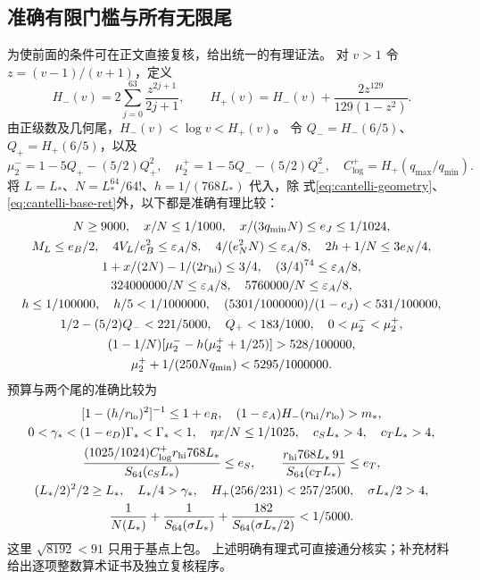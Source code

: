 \documentclass[UTF8,a4paper,11pt,fontset=fandol]{ctexart}
\theoremstyle{remark}
\begin{document}
\subsection{准确有限门槛与所有无限尾}\label{subsec:cantelli-gates}
为使前面的条件可在正文直接复核，给出统一的有理证法。
对 $v>1$ 令 $z=(v-1)/(v+1)$，定义
\[
 H_-(v)=2\sum_{j=0}^{63}\frac{z^{2j+1}}{2j+1},\qquad
 H_+(v)=H_-(v)+\frac{2z^{129}}{129(1-z^2)}.
\]
由正级数及几何尾，$H_-(v)<\log v<H_+(v)$。
令 $Q_-=H_-(6/5)$、$Q_+=H_+(6/5)$，以及
\[
 \mu_2^-=1-5Q_+-(5/2)Q_+^2,\quad
 \mu_2^+=1-5Q_--(5/2)Q_-^2,\quad
 C_{\log}^+=H_+(q_{\max}/q_{\min}).
\]
将 $L=L_*$、$N=L_*^{64}/64!$、$h=1/(768L_*)$ 代入，除
式\eqref{eq:cantelli-geometry}、\eqref{eq:cantelli-base-ret}外，以下都是准确有理比较：
\begin{equation}\label{eq:cantelli-gates1}
\begin{gathered}
 N\ge9000,\quad x/N\le1/1000,\quad x/(3q_{\min}N)\le e_J\le1/1024,\\
 M_L\le e_B/2,\quad4V_L/e_B^2\le\varepsilon_A/8,\quad
 4/(e_N^2N)\le\varepsilon_A/8,\quad2h+1/N\le3e_N/4,\\
 1+x/(2N)-1/(2r_{\rm hi})\le3/4,\quad(3/4)^{74}\le\varepsilon_A/8,\\
 324000000/N\le\varepsilon_A/8,\quad5760000/N\le\varepsilon_A/8,\\
 h\le1/100000,\quad h/5<1/1000000,\quad
 (5301/1000000)/(1-e_J)<531/100000,\\
 1/2-(5/2)Q_-<221/5000,\quad Q_+<183/1000,\quad0<\mu_2^-<\mu_2^+,\\
 (1-1/N)[\mu_2^--h(\mu_2^++1/25)]>528/100000,\\
 \mu_2^++1/(250Nq_{\min})<5295/1000000.
\end{gathered}
\end{equation}
预算与两个尾的准确比较为
\begin{equation}\label{eq:cantelli-gates2}
\begin{gathered}
 [1-(h/r_{\rm lo})^2]^{-1}\le1+e_R,\quad
 (1-\varepsilon_A)H_-(r_{\rm hi}/r_{\rm lo})>m_*,\\
 0<\gamma_*<(1-e_D)\Gamma_*<\Gamma_*<1,\quad
 \eta x/N\le1/1025,\quad c_SL_*>4,\quad c_TL_*>4,\\
 \frac{(1025/1024)C_{\log}^+r_{\rm hi}768L_*}{S_{64}(c_SL_*)}\le e_S,
 \qquad\frac{r_{\rm hi}768L_*\,91}{S_{64}(c_TL_*)}\le e_T,\\
 (L_*/2)^2/2\ge L_*,\quad L_*/4>\gamma_*,\quad
 H_+(256/231)<257/2500,\quad \sigma L_*/2>4,\\
 \frac1{N(L_*)}+\frac1{S_{64}(\sigma L_*)}
       +\frac{182}{S_{64}(\sigma L_*/2)}<1/5000.
\end{gathered}
\end{equation}
这里 $\sqrt{8192}<91$ 只用于基点上包。
上述明确有理式可直接通分核实；补充材料给出逐项整数算术证书及独立复核程序。
\end{document}
